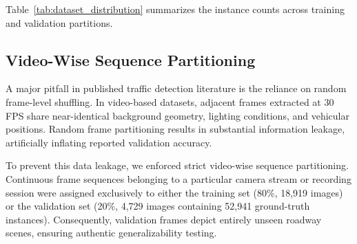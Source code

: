 \documentclass[pdflatex,sn-mathphys]{sn-jnl}
\begin{document}
Table~\ref{tab:dataset_distribution} summarizes the instance counts across training and validation partitions.

\begin{table}[t]
\caption{Distribution of Annotated Vehicle Instances in the Curated Benchmark Dataset}\label{tab:dataset_distribution}
\end{table}

\subsection{Video-Wise Sequence Partitioning}
A major pitfall in published traffic detection literature is the reliance on random frame-level shuffling. In video-based datasets, adjacent frames extracted at 30 FPS share near-identical background geometry, lighting conditions, and vehicular positions. Random frame partitioning results in substantial information leakage, artificially inflating reported validation accuracy.

To prevent this data leakage, we enforced strict video-wise sequence partitioning. Continuous frame sequences belonging to a particular camera stream or recording session were assigned exclusively to either the training set (80\%, 18,919 images) or the validation set (20\%, 4,729 images containing 52,941 ground-truth instances). Consequently, validation frames depict entirely unseen roadway scenes, ensuring authentic generalizability testing.
\end{document}

